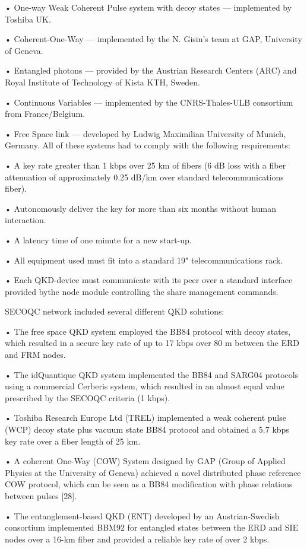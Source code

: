 • One-way Weak Coherent Pulse system with decoy states — implemented by Toshiba UK.

• Coherent-One-Way — implemented by the N. Gisin’s team at GAP, University of Geneva.

• Entangled photons — provided by the Austrian Research Centers (ARC) and Royal Institute of Technology of Kista KTH, Sweden.

• Continuous Variables — implemented by the CNRS-Thales-ULB consortium from France/Belgium.

• Free Space link — developed by Ludwig Maximilian University of Munich, Germany.
All of these systems had to comply with the following requirements:

• A key rate greater than 1 kbps over 25 km of fibers (6 dB loss with a fiber attenuation of approximately 0.25 dB/km over standard telecommunications fiber).

• Autonomously deliver the key for more than six months without human interaction.

• A latency time of one minute for a new start-up. 

• All equipment used must fit into a standard 19" telecommunications rack.

• Each QKD-device must communicate with its peer over a standard interface provided bythe node module controlling the share management commands. 

SECOQC network included several different QKD solutions:

• The free space QKD system employed the BB84 protocol with decoy states, which resulted in a secure key rate of up to 17 kbps over 80 m between the ERD and FRM nodes.

• The idQuantique QKD system implemented the BB84 and SARG04 protocols using a commercial Cerberis system, which resulted in an almost equal value prescribed by the SECOQC criteria (1 kbps).

• Toshiba Research Europe Ltd (TREL) implemented a weak coherent pulse (WCP) decoy state plus vacuum state BB84 protocol and obtained a 5.7 kbps key rate over a fiber length of
25 km.

• A coherent One-Way (COW) System designed by GAP (Group of Applied Physics at the University of Geneva) achieved a novel distributed phase reference COW protocol, which can be seen as a BB84 modification with phase relations between pulses [28].

• The entanglement-based QKD (ENT) developed by an Austrian-Swedish consortium implemented BBM92 for entangled states between the ERD and SIE nodes over a 16-km fiber and provided a reliable key rate of over 2 kbps.

